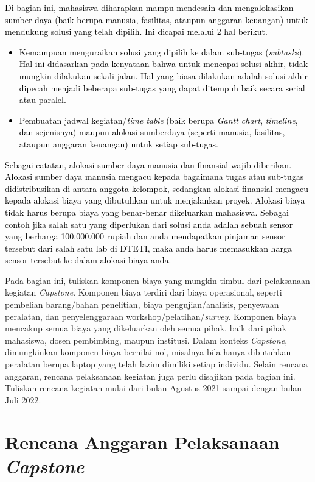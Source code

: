 \textcolor{black}{Di bagian ini, mahasiswa diharapkan mampu mendesain dan mengalokasikan sumber daya (baik berupa manusia, fasilitas, ataupun anggaran keuangan) untuk mendukung solusi yang telah dipilih. Ini dicapai melalui 2 hal berikut.
\begin{itemize}
    \item Kemampuan menguraikan solusi yang dipilih ke dalam sub-tugas (\textit{subtasks}). Hal ini didasarkan pada kenyataan bahwa untuk mencapai solusi akhir, tidak mungkin dilakukan sekali jalan. Hal yang biasa dilakukan adalah solusi akhir dipecah menjadi  beberapa sub-tugas yang dapat ditempuh baik secara serial atau paralel.
    \item Pembuatan jadwal kegiatan/\textit{time table} (baik berupa \textit{Gantt chart}, \textit{timeline}, dan sejenisnya) maupun alokasi sumberdaya (seperti manusia, fasilitas, ataupun anggaran keuangan) untuk setiap sub-tugas.
\end{itemize}
Sebagai catatan, alokasi\underline{ sumber daya  manusia dan finansial wajib diberikan}. Alokasi sumber daya manusia mengacu kepada bagaimana tugas atau sub-tugas didistribusikan di antara anggota kelompok, sedangkan alokasi finansial mengacu kepada alokasi biaya yang dibutuhkan untuk menjalankan proyek. Alokasi biaya tidak harus berupa biaya yang benar-benar dikeluarkan mahasiswa. Sebagai contoh jika salah satu yang diperlukan dari solusi anda adalah sebuah sensor yang berharga 100.000.000 rupiah dan anda mendapatkan pinjaman sensor tersebut dari salah satu lab di DTETI, maka anda harus memasukkan harga sensor tersebut ke dalam alokasi biaya anda.
}


Pada bagian ini, tuliskan komponen biaya yang mungkin timbul dari pelaksanaan kegiatan \textit{Capstone}. Komponen biaya terdiri dari biaya operasional, seperti pembelian barang/bahan penelitian, biaya pengujian/analisis, penyewaan peralatan, dan penyelenggaraan workshop/pelatihan/\textit{survey}. Komponen biaya mencakup semua biaya yang dikeluarkan oleh semua pihak, baik dari pihak mahasiswa, dosen pembimbing, maupun institusi. Dalam konteks \textit{Capstone}, dimungkinkan komponen biaya bernilai nol, misalnya bila hanya dibutuhkan peralatan berupa laptop yang telah lazim dimiliki setiap individu. Selain rencana anggaran, rencana pelaksanaan kegiatan juga perlu disajikan pada bagian ini. Tuliskan rencana kegiatan mulai dari bulan Agustus 2021 sampai dengan bulan Juli 2022.

\section{Rencana Anggaran Pelaksanaan \textit{Capstone}}

